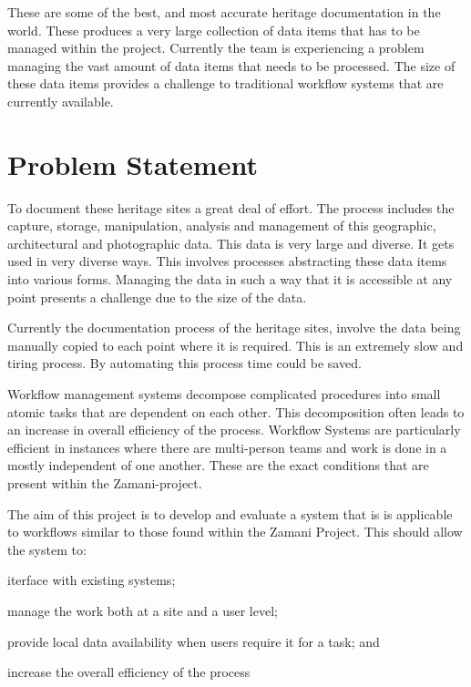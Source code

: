 \documentclass[12pt,a4paper]{report}
\begin{document}
    These are some of the best, and most accurate heritage documentation
    in the world.
    These produces a very large collection of data items that has to be managed
    within the project. Currently the team is experiencing a problem managing
    the vast amount of data items that needs to be processed. The size of these
    data items provides a challenge to traditional workflow systems that are
    currently available.


\section{Problem Statement}
    To document these heritage sites a great deal of effort. The process includes
    the capture, storage, manipulation, analysis and management of this geographic,
    architectural and photographic data. This data is very large and diverse. It gets
    used in very diverse ways. This involves processes abstracting these data
    items into various forms. Managing the data in such a way that it is accessible
    at any point presents a challenge due to the size of the data.

    Currently the documentation process of the heritage sites, involve the data being
    manually copied to each point where it is required. This is an extremely slow and
    tiring process. By automating this process time could be saved.

    Workflow management systems decompose complicated procedures into small atomic tasks
    that are dependent on each other\cite{Taylor:2006:WES:1196459}. This decomposition
    often leads to an increase in overall efficiency of the process. Workflow Systems
    are particularly efficient in instances where there are multi-person teams and work
    is done in a mostly independent of one another. These are the exact conditions that
    are present within the Zamani-project.

    The aim of this project is to develop and evaluate a system that is is applicable
    to workflows similar to those found within the Zamani Project. This should allow the
    system to: \begin{inparaenum} \item iterface with existing systems; \item manage the
    work both at a site and a user level; \item provide local data availability when users
    require it for a task; and \item increase the overall efficiency of the process
    \end{inparaenum}
\end{document}
